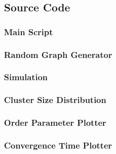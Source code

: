 \documentclass[11pt]{article}
\begin{document}
\subsection{Source Code}

\subsubsection{Main Script}



\subsubsection{Random Graph Generator}



\subsubsection{Simulation}



\subsubsection{Cluster Size Distribution}



\subsubsection{Order Parameter Plotter}



\subsubsection{Convergence Time Plotter}

\end{document}
